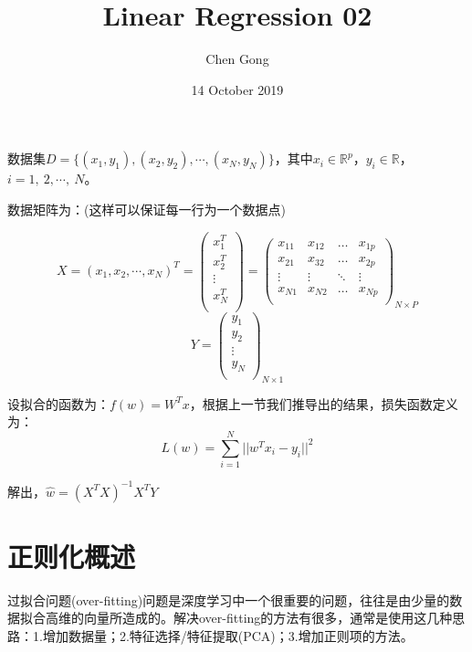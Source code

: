 \documentclass[a4paper]{article}
\title{Linear Regression 02}
\author{Chen Gong}
\date{14 October 2019}
\begin{document}
\maketitle

数据集$D=\{(x_1, y_1), (x_2, y_2), \cdots, (x_N, y_N)\}$，其中$x_i\in\mathbb{R}^{p}$，$y_i\in\mathbb{R}$，$i=1, \ 2,\cdots,\ N$。

数据矩阵为：(这样可以保证每一行为一个数据点)

\begin{equation}
    X=(x_1, x_2, \cdots, x_N)^T=
    \begin{pmatrix}
    x_1^T \\ 
    x_2^T \\
    \vdots\\
    x_N^T \\
    \end{pmatrix} =
    \begin{pmatrix}
    x_{11} & x_{12} & \dots & x_{1p}\\
    x_{21} & x_{32} & \dots & x_{2p}\\
    \vdots & \vdots & \ddots & \vdots\\
    x_{N1} & x_{N2} & \dots & x_{Np}\\
    \end{pmatrix}_{N\times P}
\end{equation}
\begin{equation}
    Y=
    \begin{pmatrix}
    y_1 \\ 
    y_2 \\
    \vdots\\
    y_N \\
    \end{pmatrix}_{N\times 1}
\end{equation}

设拟合的函数为：$f(w)=W^T x$，根据上一节我们推导出的结果，损失函数定义为：
\begin{equation}
    L(w)=\sum_{i=1}^N||w^Tx_i-y_i||^2
\end{equation}

解出，$\hat{w} = (X^TX)^{-1}X^TY$


\section{正则化概述}
过拟合问题(over-fitting)问题是深度学习中一个很重要的问题，往往是由少量的数据拟合高维的向量所造成的。解决over-fitting的方法有很多，通常是使用这几种思路：1.增加数据量；2.特征选择/特征提取(PCA)；3.增加正则项的方法。
\end{document}

